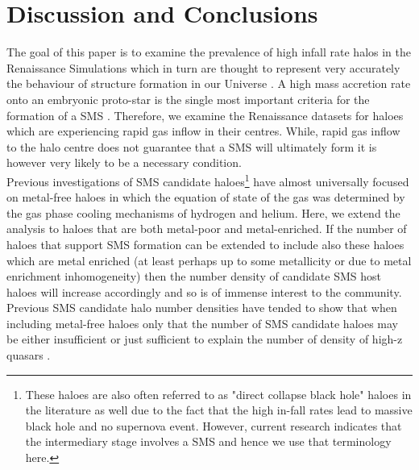 \documentclass[graphics, twocolumn, usenatbib]{mn2e}
\begin{document}
\section{Discussion and Conclusions} \label{Sec:Discussion}
The goal of this paper is to examine the prevalence of high infall rate halos in the
Renaissance Simulations which in turn are thought to represent very accurately the
behaviour of structure formation in our Universe \citep{Chen_2014, Xu_2013, Xu_2014, OShea_2015,
  Barrow_2017, Wise_2019}. A high mass accretion rate onto an embryonic proto-star is the
single most important criteria for the formation of a SMS \citep{Hosokawa_2013, Sakurai_2016,
  Woods_2018}. Therefore, we examine the Renaissance datasets for haloes which are experiencing
rapid gas inflow in their centres. While, rapid gas inflow to the halo centre does not guarantee
that a SMS will ultimately form it is however very likely to be a necessary condition. \\
\indent Previous investigations of SMS candidate haloes\footnote{These haloes are also often referred to as "direct collapse black hole" haloes in the literature as well due to the fact that the high in-fall rates lead to massive black hole and no 
supernova event. However, current research indicates that the intermediary stage involves a SMS and hence we use that terminology here.} have almost universally focused on
metal-free haloes in which the equation of state of the gas was determined by the gas phase
cooling mechanisms of hydrogen and helium. Here, we extend the analysis to haloes that are both
metal-poor and metal-enriched. If the number of haloes that support SMS formation can be extended to
include also these haloes which are metal enriched (at least perhaps up to some metallicity or
due to metal enrichment inhomogeneity) then the
number density of candidate SMS host haloes will increase accordingly and so is of
immense interest to the community. Previous SMS candidate halo number densities have
tended to show that when including metal-free haloes only that the number of SMS candidate haloes may be either insufficient or just sufficient to explain the number of density of
high-z quasars \citep{Agarwal_2012, Visbal_2014b, Agarwal_2015b, Latif_2014a,
  Valiante_2016, Habouzit_2016, Valiante_2017, Habouzit_2017, Regan_2017}. \\
\end{document}
